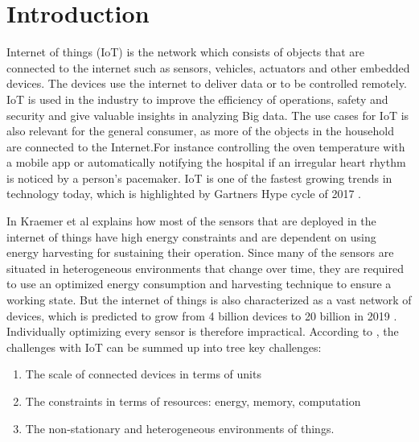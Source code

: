 \chapter{Introduction}



Internet of things (IoT) is the network which consists of objects that are connected to the internet such as sensors, vehicles, actuators and other embedded devices. The devices use the internet to deliver data or to be controlled remotely. IoT is used in the industry to improve the efficiency of operations, safety and security and give valuable insights in analyzing Big data. The use cases for IoT is also relevant for the general consumer, as more of the objects in the household are connected to the Internet.For instance controlling the oven temperature with a mobile app or automatically notifying the hospital if an irregular heart rhythm is noticed by a person's pacemaker. IoT is one of the fastest growing trends in technology today, which is highlighted by Gartners Hype cycle of 2017 \cite{Gartner}.



In \cite{kraemer} Kraemer et al explains how most of the sensors that are deployed in the internet of things have high energy constraints and are dependent on using energy harvesting for sustaining their operation. Since many of the sensors are situated in heterogeneous environments that change over time, they are required to use an optimized energy consumption and harvesting technique to ensure a working state. But the internet of things is also characterized as a vast network of devices, which is predicted to grow from 4 billion devices to 20 billion in 2019 \cite{IEA}. Individually optimizing every sensor is therefore impractical. According to \cite{frank}, the challenges with IoT can be summed up into tree key challenges: 
\begin{enumerate}
    \item The scale of connected devices in terms of units
    \item The constraints in terms of resources: energy, memory, computation
    \item The non-stationary and heterogeneous environments of things.
    \label{challenges}
    
\end{enumerate}

